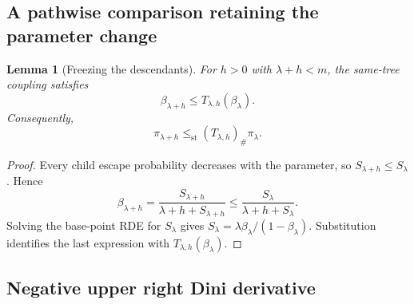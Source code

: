 \documentclass[11pt,a4paper]{article}
\numberwithin{equation}{section}
\theoremstyle{plain}
\newtheorem{lemma}[lemma]{Lemma}
\theoremstyle{definition}
\theoremstyle{remark}
\newcommand{\st}{\mathrm{st}}
\begin{document}
\subsection{A pathwise comparison retaining the parameter change}

\begin{lemma}[Freezing the descendants]\label{lem:root-comparison}
For $h>0$ with $\lambda+h<m$, the same-tree coupling satisfies
\begin{equation}\label{eq:root-comparison}
 \beta_{\lambda+h}\le T_{\lambda,h}(\beta_\lambda).
\end{equation}
Consequently,
\begin{equation}\label{eq:law-root-comparison}
 \pi_{\lambda+h}\le_{\st}(T_{\lambda,h})_\#\pi_\lambda.
\end{equation}
\end{lemma}
\begin{proof}
Every child escape probability decreases with the parameter, so
$S_{\lambda+h}\le S_\lambda$.  Hence
\begin{equation}
 \beta_{\lambda+h}
 =\frac{S_{\lambda+h}}{\lambda+h+S_{\lambda+h}}
 \le\frac{S_\lambda}{\lambda+h+S_\lambda}.
\end{equation}
Solving the base-point RDE for $S_\lambda$ gives
$S_\lambda=\lambda\beta_\lambda/(1-\beta_\lambda)$.  Substitution
identifies the last expression with $T_{\lambda,h}(\beta_\lambda)$.
\end{proof}

\subsection{Negative upper right Dini derivative}
\end{document}

